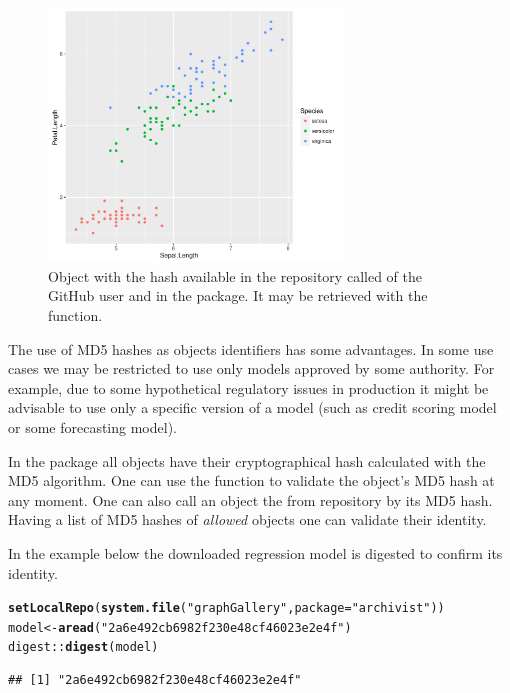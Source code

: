 \documentclass[nojss]{jss}\usepackage[]{graphicx}\usepackage[]{color}
\makeatletter
\newcommand{\hlstr}[1]{\textcolor[rgb]{0.192,0.494,0.8}{#1}}%
\newcommand{\hlopt}[1]{\textcolor[rgb]{0,0,0}{#1}}%
\newcommand{\hlstd}[1]{\textcolor[rgb]{0.345,0.345,0.345}{#1}}%
\newcommand{\hlkwb}[1]{\textcolor[rgb]{0.69,0.353,0.396}{#1}}%
\newcommand{\hlkwc}[1]{\textcolor[rgb]{0.333,0.667,0.333}{#1}}%
\newcommand{\hlkwd}[1]{\textcolor[rgb]{0.737,0.353,0.396}{\textbf{#1}}}%
\newenvironment{kframe}{%
 \def\at@end@of@kframe{}%
 \ifinner\ifhmode%
  \def\at@end@of@kframe{\end{minipage}}%
  \begin{minipage}{\columnwidth}%
 \fi\fi%
 \def\FrameCommand##1{\hskip\@totalleftmargin \hskip-\fboxsep
 \colorbox{shadecolor}{##1}\hskip-\fboxsep
     \hskip-\linewidth \hskip-\@totalleftmargin \hskip\columnwidth}%
 \MakeFramed {\advance\hsize-\width
   \@totalleftmargin\z@ \linewidth\hsize
   \@setminipage}}%
 {\par\unskip\endMakeFramed%
 \at@end@of@kframe}
\newenvironment{knitrout}{}{} %
\makeatother
\begin{document}
\begin{figure}[h!]
\centering
\includegraphics[width=0.7\textwidth]{Figures/load_02.pdf}
\caption{\label{figExample1}Object with the hash   available in the repository called  of the GitHub user  and in the  package. It may be retrieved with the  function.}
\end{figure}

The use of MD5 hashes as objects identifiers has some advantages. 
In some use cases we may be restricted to use only models approved by some authority. For example, due to some hypothetical regulatory issues in production it might be advisable to use only a specific version of a model (such as credit scoring model or some forecasting model).

In the  package all objects have their cryptographical hash calculated with the MD5 algorithm. One can use the  function to validate the object's MD5 hash at any moment. One can also call an object the from repository by its MD5 hash. Having a list of MD5 hashes of \textit{allowed} objects one can validate their identity.

In the example below the downloaded regression model is digested to confirm its identity.

\begin{knitrout}
\color{fgcolor}\begin{kframe}
\begin{alltt}
\hlkwd{setLocalRepo}\hlstd{(}\hlkwd{system.file}\hlstd{(}\hlstr{"graphGallery"}\hlstd{,} \hlkwc{package} \hlstd{=} \hlstr{"archivist"}\hlstd{))}
\hlstd{model} \hlkwb{<-} \hlkwd{aread}\hlstd{(}\hlstr{"2a6e492cb6982f230e48cf46023e2e4f"}\hlstd{)}
\hlstd{digest}\hlopt{::}\hlkwd{digest}\hlstd{(model)}
\end{alltt}
\begin{verbatim}
## [1] "2a6e492cb6982f230e48cf46023e2e4f"
\end{verbatim}
\end{kframe}
\end{knitrout}
\end{document}
